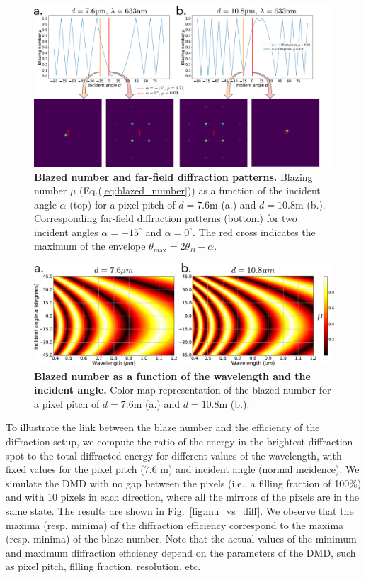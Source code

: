 \documentclass[12pt]{iopart}
\begin{document}
\begin{figure}
  \includegraphics[width = \textwidth]{images/mu_1d.pdf}
  \caption{
    \textbf{Blazed number and far-field diffraction patterns.}
    Blazing number $\mu$ (Eq.(\ref{eq:blazed_number})) as a function of the incident angle $\alpha$  (top)
    for a pixel pitch of $d=7.6$\textmu m (a.)
    and $d=10.8$\textmu m (b.).
    Corresponding far-field diffraction patterns (bottom)
    for two incident angles $\alpha = -15^\circ$ and $\alpha = 0^\circ$.
    The red cross indicates the maximum of the envelope $\theta_\text{max} = 2\theta_B - \alpha$.
  }
  \label{fig:mu76}
\end{figure}

\begin{figure}
  \centering
  \includegraphics[width = \textwidth]{images/mu_2d.pdf}
  \caption{
    \textbf{Blazed number as a function of the wavelength and the incident angle.
    }
    Color map representation of the blazed number for a pixel pitch of $d=7.6$\textmu m (a.)
    and $d=10.8$\textmu m (b.).
  }
  \label{fig:mu_2d}
\end{figure}

To illustrate the link between the blaze number and the efficiency of the diffraction setup, 
we compute the ratio of the energy in the brightest diffraction spot to the total diffracted energy 
for different values of the wavelength, 
with fixed values for the pixel pitch (7.6 \textmu m) and incident angle (normal incidence).
We simulate the DMD with no gap between the pixels (i.e., a filling fraction of 100\%) 
and with 10 pixels in each direction, 
where all the mirrors of the pixels are in the same state. 
The results are shown in Fig.~\ref{fig:mu_vs_diff}.
We observe that the maxima (resp. minima) of the diffraction efficiency 
correspond to the maxima (resp. minima) of the blaze number. 
Note that the actual values of the minimum and maximum diffraction efficiency depend on the parameters of the DMD, such as pixel pitch, filling fraction, resolution, etc.\\
\end{document}
